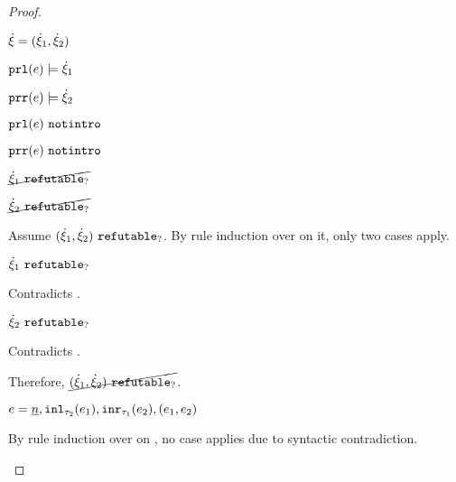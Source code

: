 \begin{proof}
\begin{byCases}
\begin{pfsteps*}
    \end{pfsteps*}
\item[\text{(\ref{rule:CSNotIntroPair})}]
    \begin{pfsteps*}
    \item $\dot{\xi}=(\dot{\xi}_1 , \dot{\xi}_2)$ 
    \item $\mathtt{prl}(e) \models \dot{\xi}_1$  
    \item $\mathtt{prr}(e) \models \dot{\xi}_2$  
    \item $\mathtt{prl}(e) ~\mathtt{notintro}$  
    \item $\mathtt{prr}(e) ~\mathtt{notintro}$  
    \item $\cancel{\dot{\xi}_1 ~\mathtt{refutable}_?}$  
    \item $\cancel{\dot{\xi}_2 ~\mathtt{refutable}_?}$  
    \end{pfsteps*}
    Assume $(\dot{\xi}_1 , \dot{\xi}_2) ~\mathtt{refutable}_?$. By rule induction over  on it, only two cases apply.
    \begin{byCases}
    \item[\text{(\ref{rule:RXPairL})}]
        \begin{pfsteps*}
        \item $\dot{\xi}_1 ~\mathtt{refutable}_?$ 
        \end{pfsteps*}
        Contradicts .
    \item[\text{(\ref{rule:RXPairR})}]
        \begin{pfsteps*}
        \item $\dot{\xi}_2 ~\mathtt{refutable}_?$ 
        \end{pfsteps*}
        Contradicts .
    \end{byCases}
    Therefore, $\cancel{(\dot{\xi}_1 , \dot{\xi}_2) ~\mathtt{refutable}_?}$.
\item
    \begin{pfsteps*}
    \item $e=\underline{n},\mathtt{inl}_{\tau_2}({e_1}),\mathtt{inr}_{\tau_1}({e_2}),(e_1 , e_2)$ 
    \end{pfsteps*}
    By rule induction over  on , no case applies due to syntactic contradiction.
\end{byCases}
\resetpfcounter
\end{proof}

